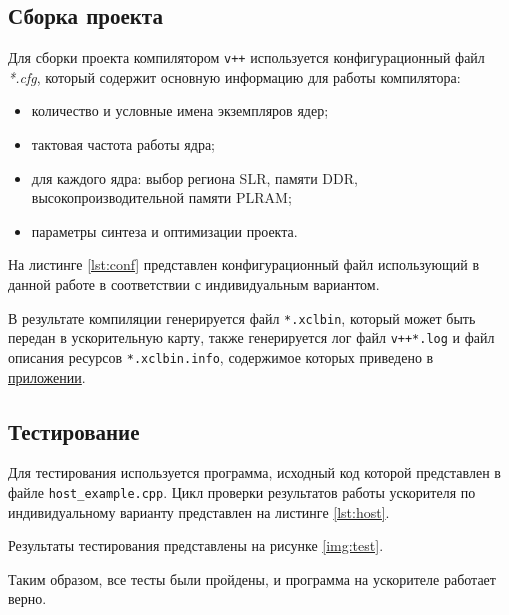 


\subsection{Сборка проекта}

Для сборки проекта компилятором \texttt{v++} используется конфигурационный файл
\textit{*.cfg}, который содержит основную информацию для работы компилятора:

\begin{itemize}
    \item количество и условные имена экземпляров ядер;
    \item тактовая частота работы ядра;
    \item для каждого ядра: выбор региона SLR, памяти DDR,
          высокопроизводительной памяти PLRAM;
    \item параметры синтеза и оптимизации проекта.
\end{itemize}

На листинге \ref{lst:conf} представлен конфигурационный файл использующий в
данной работе в соответствии с индивидуальным вариантом.


В результате компиляции генерируется файл \texttt{*.xclbin}, который может быть
передан в ускорительную карту, также генерируется лог файл \texttt{v++*.log} и
файл описания ресурсов \texttt{*.xclbin.info}, содержимое которых приведено в
\hyperlink{apA}{приложении}.

\subsection{Тестирование}

Для тестирования используется программа, исходный код которой представлен в
файле \texttt{host\_example.cpp}. Цикл проверки результатов работы ускорителя по
индивидуальному варианту представлен на листинге \ref{lst:host}.


Результаты тестирования представлены на рисунке \ref{img:test}.


Таким образом, все тесты были пройдены, и программа на ускорителе работает
верно.
